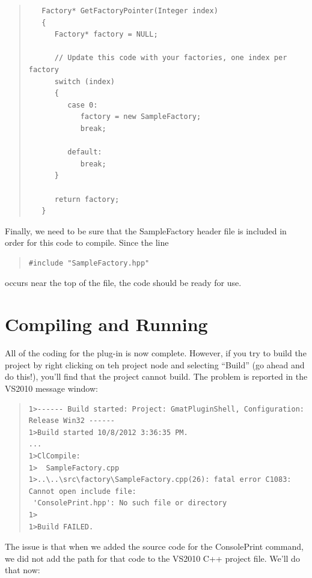 \documentclass[10pt,letterpaper]{article}
\begin{document}
\begin{quote}
\begin{verbatim}
   Factory* GetFactoryPointer(Integer index)
   {
      Factory* factory = NULL;

	  // Update this code with your factories, one index per factory
      switch (index)
      {
         case 0:
            factory = new SampleFactory;
            break;
            
         default:
            break;
      }

      return factory;
   }
\end{verbatim}
\end{quote}

Finally, we need to be sure that the SampleFactory header file is included in order for this code to compile.  Since the line

\begin{quote}
\begin{verbatim}
#include "SampleFactory.hpp"
\end{verbatim}
\end{quote}

\noindent occurs near the top of the file, the code should be ready for use.

\section{Compiling and Running}

All of the coding for the plug-in is now complete.  However, if you try to build the project by right clicking on teh project node and selecting ``Build'' (go ahead and do this!), you'll find that the project cannot build.  The problem is reported in the VS2010 message window:

\begin{quote}
\begin{verbatim}
1>------ Build started: Project: GmatPluginShell, Configuration: Release Win32 ------
1>Build started 10/8/2012 3:36:35 PM.
...
1>ClCompile:
1>  SampleFactory.cpp
1>..\..\src\factory\SampleFactory.cpp(26): fatal error C1083: Cannot open include file:
 'ConsolePrint.hpp': No such file or directory
1>
1>Build FAILED.
\end{verbatim}
\end{quote}

The issue is that when we added the source code for the ConsolePrint command, we did not add the path for that code to the VS2010 C++ project file.  We'll do that now:
\end{document}
